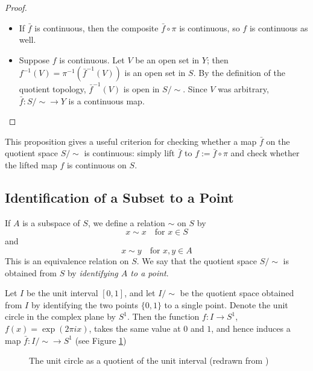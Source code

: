 \begin{proof}
	\begin{itemize}
		\item [($\Longrightarrow$)] If $\bar{f}$ is continuous, then the
		      composite $\bar{f}\circ \pi$ is continuous, so $f$ is continuous as
		      well.
		\item [($\Longleftarrow$)] Suppose $f$ is continuous. Let $V$ be an
		      open set in $Y$; then $f^{-1}(V)=\pi^{-1}(\bar{f}^{-1}(V))$ is an
		      open set in $S$. By the definition of the quotient topology,
		      $\bar{f}^{-1}(V)$ is open in $S/\sim$. Since $V$ was arbitrary,
		      $\bar{f}: S/\sim\to Y$ is a continuous map.
	\end{itemize}
\end{proof}

This proposition gives a useful criterion for checking whether a map
$\bar{f}$ on the quotient space $S/\sim$ is continuous: simply lift $\bar{f}$
to $f := \bar{f}\circ \pi$ and check whether the lifted map $f$ is continuous
on $S$.


\subsection{Identification of a Subset to a Point}
If $A$ is a subspace of $S$, we define a relation $\sim$ on $S$ by
\begin{displaymath}
	x\sim x \quad \text{for $x\in S$}
\end{displaymath}
and
\begin{displaymath}
	x\sim y \quad \text{for $x,y\in A$}
\end{displaymath}
This is an equivalence relation on $S$. We say that the quotient space
$S/\sim$ is obtained from $S$ by \emph{identifying $A$ to a point}.

\begin{example}
	Let $I$ be the unit interval $[0,1]$, and let $I/\sim$ be the quotient
	space obtained from $I$ by identifying the two points $\{0,1\}$ to a
	single point. Denote the unit circle in the complex plane by $S^1$. Then
	the function $f:I\to S^1$, $f(x)=\exp(2\pi i x)$, takes the same value
	at $0$ and $1$, and hence induces a map $\bar{f}: I/\sim \to S^1$ (see
	Figure \ref{fig:circle-as-quotient-of-interval})

	\begin{figure}[ht]
		\centering
		\caption{The unit circle as a quotient of the unit interval (redrawn
			from \cite{tu_introduction_2011})}
		\label{fig:circle-as-quotient-of-interval}
	\end{figure}
\end{example}


